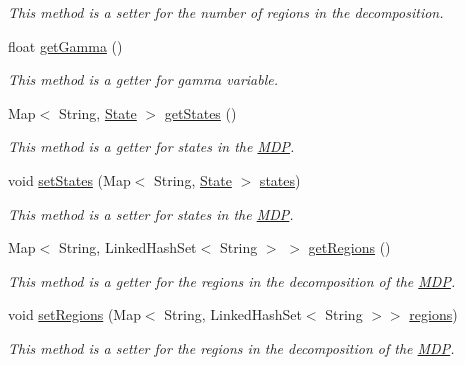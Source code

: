 \begin{DoxyCompactItemize}
\begin{DoxyCompactList}\small\item\em This method is a setter for the number of regions in the decomposition. \end{DoxyCompactList}\item 
float \hyperlink{classese_1_1seas_1_1upenn_1_1edu_1_1_m_d_p_ad3bebff77c92d587d4cf2e54c606a6a2}{get\+Gamma} ()
\begin{DoxyCompactList}\small\item\em This method is a getter for gamma variable. \end{DoxyCompactList}\item 
Map$<$ String, \hyperlink{classese_1_1seas_1_1upenn_1_1edu_1_1_state}{State} $>$ \hyperlink{classese_1_1seas_1_1upenn_1_1edu_1_1_m_d_p_a368f9fd64246a2a066f98ae229ccc9ab}{get\+States} ()
\begin{DoxyCompactList}\small\item\em This method is a getter for states in the \hyperlink{classese_1_1seas_1_1upenn_1_1edu_1_1_m_d_p}{M\+D\+P}. \end{DoxyCompactList}\item 
void \hyperlink{classese_1_1seas_1_1upenn_1_1edu_1_1_m_d_p_ab3157a2894a6adecd450820fe863048b}{set\+States} (Map$<$ String, \hyperlink{classese_1_1seas_1_1upenn_1_1edu_1_1_state}{State} $>$ \hyperlink{classese_1_1seas_1_1upenn_1_1edu_1_1_m_d_p_a6d9956c1180bfa49e36daf7a9348ee49}{states})
\begin{DoxyCompactList}\small\item\em This method is a setter for states in the \hyperlink{classese_1_1seas_1_1upenn_1_1edu_1_1_m_d_p}{M\+D\+P}. \end{DoxyCompactList}\item 
Map$<$ String, Linked\+Hash\+Set$<$ String $>$ $>$ \hyperlink{classese_1_1seas_1_1upenn_1_1edu_1_1_m_d_p_a6b9a6199604bc5d63083d0b35b5c1bd5}{get\+Regions} ()
\begin{DoxyCompactList}\small\item\em This method is a getter for the regions in the decomposition of the \hyperlink{classese_1_1seas_1_1upenn_1_1edu_1_1_m_d_p}{M\+D\+P}. \end{DoxyCompactList}\item 
void \hyperlink{classese_1_1seas_1_1upenn_1_1edu_1_1_m_d_p_a38e59bfc73d139a836ec0f290d2972ac}{set\+Regions} (Map$<$ String, Linked\+Hash\+Set$<$ String $>$$>$ \hyperlink{classese_1_1seas_1_1upenn_1_1edu_1_1_m_d_p_a168a72d2ae768cb6a747e3124e008ed1}{regions})
\begin{DoxyCompactList}\small\item\em This method is a setter for the regions in the decomposition of the \hyperlink{classese_1_1seas_1_1upenn_1_1edu_1_1_m_d_p}{M\+D\+P}. \end{DoxyCompactList}\item 
$$
\end{DoxyCompactItemize}
